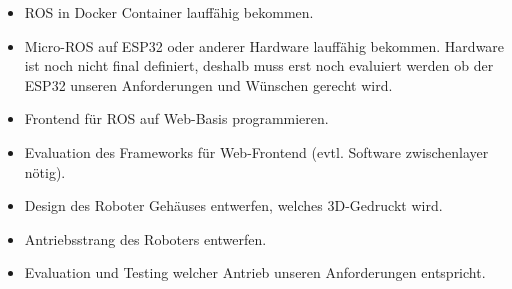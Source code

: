\begin{flushleft}
    \begin{itemize}
    \item ROS in Docker Container lauffähig bekommen.
    \item Micro-ROS auf ESP32 oder anderer Hardware lauffähig bekommen.
    Hardware ist noch nicht final definiert, deshalb muss erst noch evaluiert werden ob der ESP32 unseren
    Anforderungen und Wünschen gerecht wird.
    \item Frontend für ROS auf Web-Basis programmieren.
    \item Evaluation des Frameworks für Web-Frontend (evtl. Software zwischenlayer nötig).
    \item Design des Roboter Gehäuses entwerfen, welches 3D-Gedruckt wird.
    \item Antriebsstrang des Roboters entwerfen.
    \item Evaluation und Testing welcher Antrieb unseren Anforderungen entspricht.
    \end{itemize}
\end{flushleft}